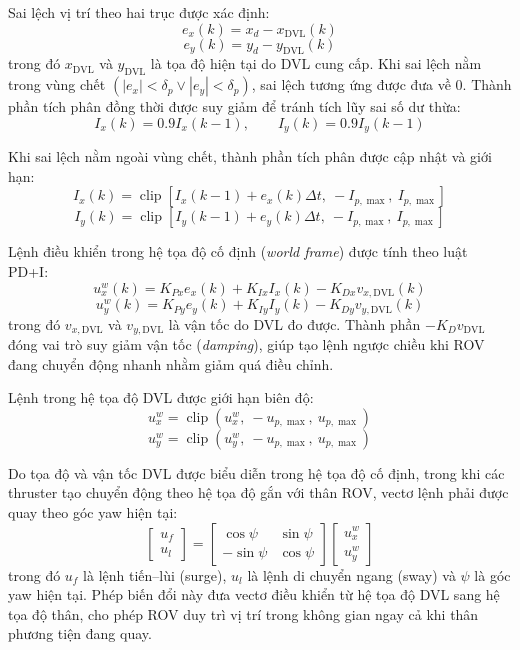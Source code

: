 \documentclass[../DoAn.tex]{subfiles}
\begin{document}
Sai lệch vị trí theo hai trục được xác định:
\[
e_x(k) = x_d - x_{\mathrm{DVL}}(k)
\]
\[
e_y(k) = y_d - y_{\mathrm{DVL}}(k)
\]
trong đó $x_{\mathrm{DVL}}$ và $y_{\mathrm{DVL}}$ là tọa độ hiện tại do DVL cung cấp. Khi sai lệch nằm trong vùng chết $(|e_x| < \delta_p \lor |e_y| < \delta_p)$, sai lệch tương ứng được đưa về 0. Thành phần tích phân đồng thời được suy giảm để tránh tích lũy sai số dư thừa:
\[
I_x(k) = 0.9 I_x(k-1), \qquad I_y(k) = 0.9 I_y(k-1)
\]

Khi sai lệch nằm ngoài vùng chết, thành phần tích phân được cập nhật và giới hạn:
\[
I_x(k) = \operatorname{clip}\left[ I_x(k-1) + e_x(k)\Delta t,\ -I_{p,\max},\ I_{p,\max} \right]
\]
\[
I_y(k) = \operatorname{clip}\left[ I_y(k-1) + e_y(k)\Delta t,\ -I_{p,\max},\ I_{p,\max} \right]
\]

Lệnh điều khiển trong hệ tọa độ cố định (\textit{world frame}) được tính theo luật PD+I:
\[
u_x^{w}(k) = K_{Px}e_x(k) + K_{Ix}I_x(k) - K_{Dx}v_{x,\mathrm{DVL}}(k)
\]
\[
u_y^{w}(k) = K_{Py}e_y(k) + K_{Iy}I_y(k) - K_{Dy}v_{y,\mathrm{DVL}}(k)
\]
trong đó $v_{x,\mathrm{DVL}}$ và $v_{y,\mathrm{DVL}}$ là vận tốc do DVL đo được. Thành phần $-K_D v_{\mathrm{DVL}}$ đóng vai trò suy giảm vận tốc (\textit{damping}), giúp tạo lệnh ngược chiều khi ROV đang chuyển động nhanh nhằm giảm quá điều chỉnh.

Lệnh trong hệ tọa độ DVL được giới hạn biên độ:
\[
u_x^{w} = \operatorname{clip}\left(u_x^{w},\ -u_{p,\max},\ u_{p,\max}\right)
\]
\[
u_y^{w} = \operatorname{clip}\left(u_y^{w},\ -u_{p,\max},\ u_{p,\max}\right)
\]

Do tọa độ và vận tốc DVL được biểu diễn trong hệ tọa độ cố định, trong khi các thruster tạo chuyển động theo hệ tọa độ gắn với thân ROV, vectơ lệnh phải được quay theo góc yaw hiện tại:
\[
\begin{bmatrix}
u_f \\ u_l
\end{bmatrix}
=
\begin{bmatrix}
\cos\psi & \sin\psi \\
-\sin\psi & \cos\psi
\end{bmatrix}
\begin{bmatrix}
u_x^{w} \\ u_y^{w}
\end{bmatrix}
\]
trong đó $u_f$ là lệnh tiến--lùi (surge), $u_l$ là lệnh di chuyển ngang (sway) và $\psi$ là góc yaw hiện tại. Phép biến đổi này đưa vectơ điều khiển từ hệ tọa độ DVL sang hệ tọa độ thân, cho phép ROV duy trì vị trí trong không gian ngay cả khi thân phương tiện đang quay.
\end{document}
